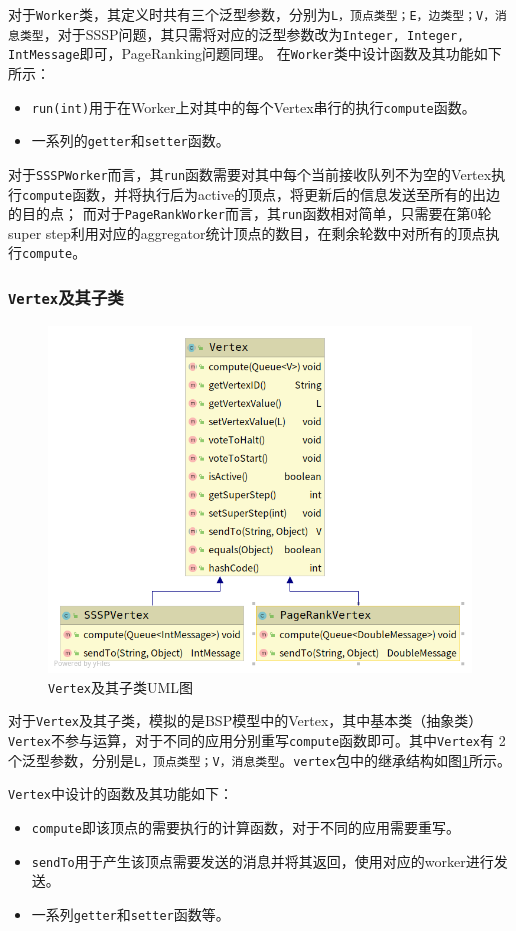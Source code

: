 \documentclass{ML}
\begin{document}
对于\texttt{Worker}类，其定义时共有三个泛型参数，分别为\texttt{L，顶点类型；E，边类型；V，消息类型}，对于SSSP问题，其只需将对应的泛型参数改为\texttt{Integer, Integer, IntMessage}即可，PageRanking问题同理。
在\texttt{Worker}类中设计函数及其功能如下所示：
\begin{itemize}
    \item \texttt{run(int)}用于在Worker上对其中的每个Vertex串行的执行\texttt{compute}函数。
    \item 一系列的\texttt{getter}和\texttt{setter}函数。
\end{itemize}

对于\texttt{SSSPWorker}而言，其\texttt{run}函数需要对其中每个当前接收队列不为空的Vertex执行\texttt{compute}函数，并将执行后为active的顶点，将更新后的信息发送至所有的出边的目的点；
而对于\texttt{PageRankWorker}而言，其\texttt{run}函数相对简单，只需要在第0轮super step利用对应的aggregator统计顶点的数目，在剩余轮数中对所有的顶点执行\texttt{compute}。

\subsubsection{\texttt{Vertex}及其子类}\label{sec:vertex}
\begin{figure}[htb]
    \centering
    \includegraphics[width=0.7\linewidth]{media/vertex.png}
    \caption{\texttt{Vertex}及其子类UML图}\label{fig:vertex}
\end{figure}
对于\texttt{Vertex}及其子类，模拟的是BSP模型中的Vertex，其中基本类（抽象类）\texttt{Vertex}不参与运算，对于不同的应用分别重写\texttt{compute}函数即可。其中\texttt{Vertex}有
2个泛型参数，分别是\texttt{L，顶点类型；V，消息类型}。\texttt{vertex}包中的继承结构如图\ref{fig:vertex}所示。

\texttt{Vertex}中设计的函数及其功能如下：
\begin{itemize}
    \item \texttt{compute}即该顶点的需要执行的计算函数，对于不同的应用需要重写。
    \item \texttt{sendTo}用于产生该顶点需要发送的消息并将其返回，使用对应的worker进行发送。
    \item 一系列\texttt{getter}和\texttt{setter}函数等。
\end{itemize}
\end{document}
